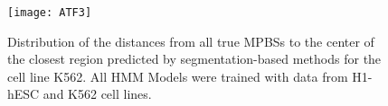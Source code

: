\documentclass[11pt,a4]{article}
\begin{document}
\begin{figure}[h]
\centering
    \texttt{[image: ATF3]}
\caption{Distribution of the distances from all true MPBSs to the center of the closest region predicted by segmentation-based methods for the cell line K562. All HMM Models were trained with data from H1-hESC and K562 cell lines.}
\label{fig:boxplot.K562.fdr_4.16}
\end{figure}
\end{document}
